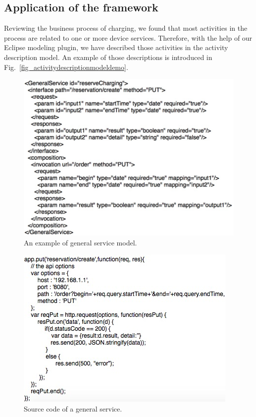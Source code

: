 \subsection{Application of the framework}
Reviewing the business process of charging, we found that most activities in the process are related to one or more device services. Therefore, with the help of our Eclipse modeling plugin, we have described those activities in the activity description model. An example of those descriptions is introduced in Fig.~\ref{fig_activitydescriptionmodeldemo}. 

\begin{figure}[!t]
\centering
\includegraphics[width=1.0\linewidth]{./graph/generalservicedemo}
\caption{An example of general service model.}
\label{fig_generalservicedemo}
\end{figure}

\begin{figure}[!b]
\centering
\includegraphics[width=1.0\linewidth]{./graph/sourcecode}
\caption{Source code of a general service.}
\label{fig_sourcecode}
\end{figure}

